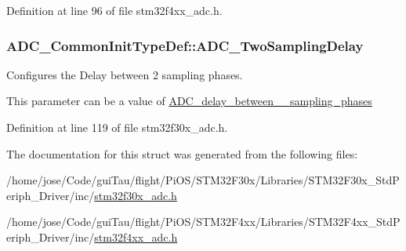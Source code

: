 Definition at line 96 of file stm32f4xx\-\_\-adc.\-h.

\hypertarget{struct_a_d_c___common_init_type_def_ad389f40f78d6856c0ea7e00583cbb0ff}{
\subsubsection[{A\-D\-C\-\_\-\-Two\-Sampling\-Delay}]{ A\-D\-C\-\_\-\-Common\-Init\-Type\-Def\-::\-A\-D\-C\-\_\-\-Two\-Sampling\-Delay}}\label{struct_a_d_c___common_init_type_def_ad389f40f78d6856c0ea7e00583cbb0ff}
\begin{DoxyVerb}         Configures the Delay between 2 sampling phases.
\end{DoxyVerb}
 This parameter can be a value of \hyperlink{group___a_d_c__delay__between__2__sampling__phases}{A\-D\-C\-\_\-delay\-\_\-between\-\_\-\_\-sampling\-\_\-phases} 

Definition at line 119 of file stm32f30x\-\_\-adc.\-h.



The documentation for this struct was generated from the following files\-:\begin{DoxyCompactItemize}
\item 
/home/jose/\-Code/gui\-Tau/flight/\-Pi\-O\-S/\-S\-T\-M32\-F30x/\-Libraries/\-S\-T\-M32\-F30x\-\_\-\-Std\-Periph\-\_\-\-Driver/inc/\hyperlink{stm32f30x__adc_8h}{stm32f30x\-\_\-adc.\-h}\item 
/home/jose/\-Code/gui\-Tau/flight/\-Pi\-O\-S/\-S\-T\-M32\-F4xx/\-Libraries/\-S\-T\-M32\-F4xx\-\_\-\-Std\-Periph\-\_\-\-Driver/inc/\hyperlink{stm32f4xx__adc_8h}{stm32f4xx\-\_\-adc.\-h}\end{DoxyCompactItemize}
